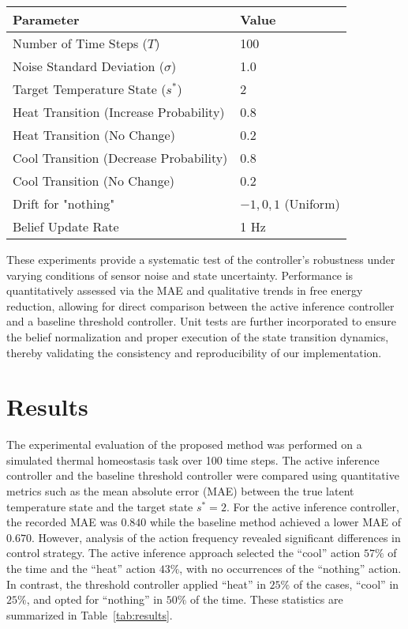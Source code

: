 \documentclass[11pt]{article}
\begin{document}
\begin{center}
\begin{tabular}{ll}
\textbf{Parameter} & \textbf{Value} \\
\hline
Number of Time Steps (\(T\)) & 100 \\
Noise Standard Deviation (\(\sigma\)) & 1.0 \\
Target Temperature State (\(s^*\)) & 2 \\
Heat Transition (Increase Probability) & 0.8 \\
Heat Transition (No Change) & 0.2 \\
Cool Transition (Decrease Probability) & 0.8 \\
Cool Transition (No Change) & 0.2 \\
Drift for "nothing" & \(-1,0,1\) (Uniform) \\
Belief Update Rate & 1 Hz \\
\end{tabular}
\end{center}

These experiments provide a systematic test of the controller’s robustness under varying conditions of sensor noise and state uncertainty. Performance is quantitatively assessed via the MAE and qualitative trends in free energy reduction, allowing for direct comparison between the active inference controller and a baseline threshold controller. Unit tests are further incorporated to ensure the belief normalization and proper execution of the state transition dynamics, thereby validating the consistency and reproducibility of our implementation.

\section{Results}
The experimental evaluation of the proposed method was performed on a simulated thermal homeostasis task over 100 time steps. The active inference controller and the baseline threshold controller were compared using quantitative metrics such as the mean absolute error (MAE) between the true latent temperature state and the target state \(s^*=2\). For the active inference controller, the recorded MAE was \(0.840\) while the baseline method achieved a lower MAE of \(0.670\). However, analysis of the action frequency revealed significant differences in control strategy. The active inference approach selected the “cool” action \(57\%\) of the time and the “heat” action \(43\%\), with no occurrences of the “nothing” action. In contrast, the threshold controller applied “heat” in \(25\%\) of the cases, “cool” in \(25\%\), and opted for “nothing” in \(50\%\) of the time. These statistics are summarized in Table~\ref{tab:results}.
\end{document}
